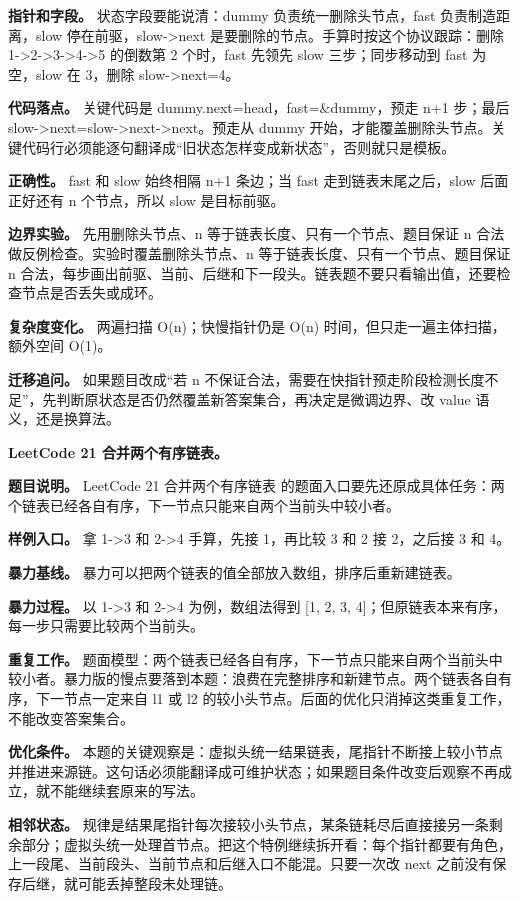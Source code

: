 \textbf{指针和字段。} 状态字段要能说清：dummy 负责统一删除头节点，fast 负责制造距离，slow 停在前驱，slow->next 是要删除的节点。手算时按这个协议跟踪：删除 1->2->3->4->5 的倒数第 2 个时，fast 先领先 slow 三步；同步移动到 fast 为空，slow 在 3，删除 slow->next=4。

\textbf{代码落点。} 关键代码是 dummy.next=head，fast=\&dummy，预走 n+1 步；最后 slow->next=slow->next->next。预走从 dummy 开始，才能覆盖删除头节点。关键代码行必须能逐句翻译成“旧状态怎样变成新状态”，否则就只是模板。

\textbf{正确性。} fast 和 slow 始终相隔 n+1 条边；当 fast 走到链表末尾之后，slow 后面正好还有 n 个节点，所以 slow 是目标前驱。

\textbf{边界实验。} 先用删除头节点、n 等于链表长度、只有一个节点、题目保证 n 合法做反例检查。实验时覆盖删除头节点、n 等于链表长度、只有一个节点、题目保证 n 合法，每步画出前驱、当前、后继和下一段头。链表题不要只看输出值，还要检查节点是否丢失或成环。

\textbf{复杂度变化。} 两遍扫描 O(n)；快慢指针仍是 O(n) 时间，但只走一遍主体扫描，额外空间 O(1)。

\textbf{迁移追问。} 如果题目改成“若 n 不保证合法，需要在快指针预走阶段检测长度不足”，先判断原状态是否仍然覆盖新答案集合，再决定是微调边界、改 value 语义，还是换算法。

\noindent\textbf{LeetCode 21 合并两个有序链表。}

\textbf{题目说明。} LeetCode 21 合并两个有序链表 的题面入口要先还原成具体任务：两个链表已经各自有序，下一节点只能来自两个当前头中较小者。

\textbf{样例入口。} 拿 1->3 和 2->4 手算，先接 1，再比较 3 和 2 接 2，之后接 3 和 4。

\textbf{暴力基线。} 暴力可以把两个链表的值全部放入数组，排序后重新建链表。

\textbf{暴力过程。} 以 1->3 和 2->4 为例，数组法得到 [1, 2, 3, 4]；但原链表本来有序，每一步只需要比较两个当前头。

\textbf{重复工作。} 题面模型：两个链表已经各自有序，下一节点只能来自两个当前头中较小者。暴力版的慢点要落到本题：浪费在完整排序和新建节点。两个链表各自有序，下一节点一定来自 l1 或 l2 的较小头节点。后面的优化只消掉这类重复工作，不能改变答案集合。

\textbf{优化条件。} 本题的关键观察是：虚拟头统一结果链表，尾指针不断接上较小节点并推进来源链。这句话必须能翻译成可维护状态；如果题目条件改变后观察不再成立，就不能继续套原来的写法。

\textbf{相邻状态。} 规律是结果尾指针每次接较小头节点，某条链耗尽后直接接另一条剩余部分；虚拟头统一处理首节点。把这个特例继续拆开看：每个指针都要有角色，上一段尾、当前段头、当前节点和后继入口不能混。只要一次改 next 之前没有保存后继，就可能丢掉整段未处理链。

